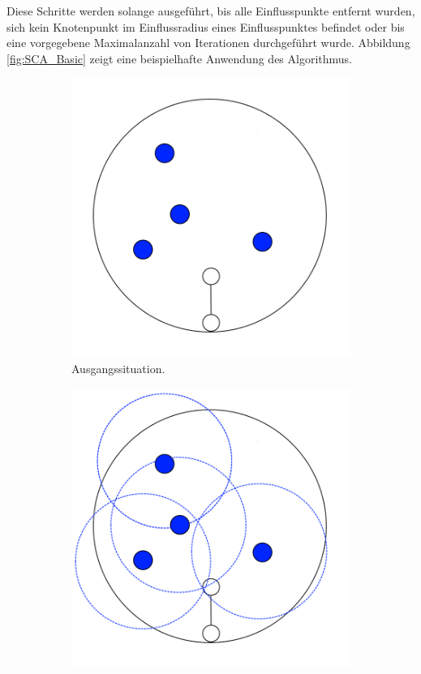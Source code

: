 Diese Schritte werden solange ausgeführt, bis alle Einflusspunkte entfernt wurden, sich kein Knotenpunkt im Einflussradius eines Einflusspunktes befindet oder bis eine vorgegebene Maximalanzahl von Iterationen durchgeführt wurde. Abbildung \ref{fig:SCA_Basic} zeigt eine beispielhafte Anwendung des Algorithmus.

\begin{figure} [hbtp]
	\centering
	\begin{subfigure}[t]{.31\textwidth}
		\centering
		\includegraphics[width=\linewidth]{images/SCA_Basic1.png}
		\caption{ Ausgangssituation. }
		\label{subfig:SCA_Basic1}
	\end{subfigure}
	\hspace{.01\textwidth}
	\begin{subfigure}[t]{.31\textwidth}
		\centering
		\includegraphics[width=\linewidth]{images/SCA_Basic2.png}

\end{subfigure}
\end{figure}
